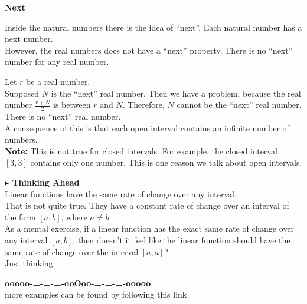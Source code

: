 \documentclass{ximera}
\begin{document}
\begin{idea} \textbf{\textcolor{blue!55!black}{Next}}



Inside the natural numbers there is the idea of ``next''.  Each natural number has a next number. \\


However, the real numbers does not have a ``next'' property.  There is no ``next'' number for any real number.


Let $r$ be a real number. \\

Supposed $N$ is the ``next'' real number.  Then we have a problem, because the real number $\frac{r+N}{2}$ is between $r$ and $N$.  Therefore, $N$ cannot be the ``next'' real number.  There is no ``next'' real number. \\


A consequence of this is that each open interval contains an infinite number of numbers. \\



\textbf{Note: } This is not true for closed intervals.  For example, the closed interval $[3, 3]$ contains only one number.  This is one reason we talk about open intervals.



\end{idea}





\textbf{\textcolor{red!70!black}{$\blacktriangleright$ Thinking Ahead}} \\


Linear functions have the same rate of change over any interval. \\

That is not quite true.  They have a constant rate of change over an interval of the form $[a, b]$, where $a \ne b$. \\

As a mental exercise, if a linear function has the exact same rate of change over any interval $[a, b]$, then doesn't it feel like the linear function should have the same rate of change over the interval $[a, a]$? \\

Just thinking.






\begin{center}
\textbf{\textcolor{green!50!black}{ooooo-=-=-=-ooOoo-=-=-=-ooooo}} \\

more examples can be found by following this link\\ 

\end{center}
\end{document}
